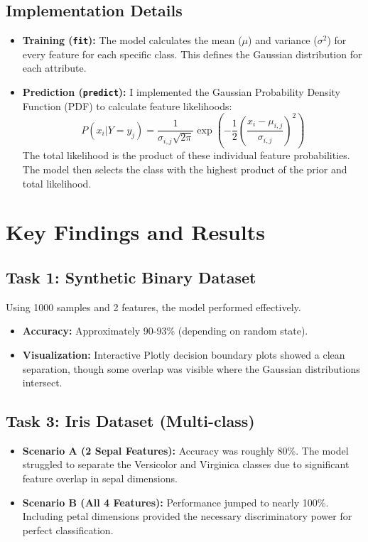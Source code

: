 \documentclass[11pt]{article}
\begin{document}
\subsection{Implementation Details}
\begin{itemize}
    \item \textbf{Training (\texttt{fit}):} The model calculates the mean ($\mu$) and variance ($\sigma^2$) for every feature for each specific class. This defines the Gaussian distribution for each attribute.
    \item \textbf{Prediction (\texttt{predict}):} I implemented the Gaussian Probability Density Function (PDF) to calculate feature likelihoods:
    \begin{equation}
    P(x_i|Y=y_j) = \frac{1}{\sigma_{i,j}\sqrt{2\pi}} \exp\left(-\frac{1}{2}\left(\frac{x_i-\mu_{i,j}}{\sigma_{i,j}}\right)^2\right)
    \end{equation}
    The total likelihood is the product of these individual feature probabilities. The model then selects the class with the highest product of the prior and total likelihood.
\end{itemize}

\section{Key Findings and Results}

\subsection{Task 1: Synthetic Binary Dataset}
Using 1000 samples and 2 features, the model performed effectively.
\begin{itemize}
    \item \textbf{Accuracy:} Approximately 90-93\% (depending on random state).
    \item \textbf{Visualization:} Interactive Plotly decision boundary plots showed a clean separation, though some overlap was visible where the Gaussian distributions intersect.
\end{itemize}

\subsection{Task 3: Iris Dataset (Multi-class)}
\begin{itemize}
    \item \textbf{Scenario A (2 Sepal Features):} Accuracy was roughly 80\%. The model struggled to separate the Versicolor and Virginica classes due to significant feature overlap in sepal dimensions.
    \item \textbf{Scenario B (All 4 Features):} Performance jumped to nearly 100\%. Including petal dimensions provided the necessary discriminatory power for perfect classification.
\end{itemize}
\end{document}
